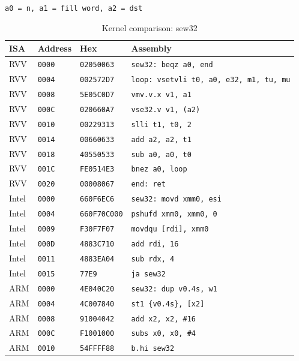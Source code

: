 \begin{table}[htbp]
\centering
\caption{Kernel comparison: sew32}
\begingroup
\scriptsize
\setlength{\tabcolsep}{4pt}
\noindent \texttt{a0 = n, a1 = fill word, a2 = dst}\par
\vspace{0.6ex}
\begin{tabular}{@{}l|l|l|p{7.2cm}@{}}
\toprule
ISA & Address & Hex & Assembly \\
\midrule
RVV & \texttt{0000} & \texttt{02050063} & \texttt{sew32: beqz a0, end} \\
RVV & \texttt{0004} & \texttt{002572D7} & \texttt{loop: vsetvli t0, a0, e32, m1, tu, mu} \\
RVV & \texttt{0008} & \texttt{5E05C0D7} & \texttt{vmv.v.x v1, a1} \\
RVV & \texttt{000C} & \texttt{020660A7} & \texttt{vse32.v v1, (a2)} \\
RVV & \texttt{0010} & \texttt{00229313} & \texttt{slli t1, t0, 2} \\
RVV & \texttt{0014} & \texttt{00660633} & \texttt{add a2, a2, t1} \\
RVV & \texttt{0018} & \texttt{40550533} & \texttt{sub a0, a0, t0} \\
RVV & \texttt{001C} & \texttt{FE0514E3} & \texttt{bnez a0, loop} \\
RVV & \texttt{0020} & \texttt{00008067} & \texttt{end: ret} \\
\midrule
Intel & \texttt{0000} & \texttt{660F6EC6} & \texttt{sew32: movd xmm0, esi} \\
Intel & \texttt{0004} & \texttt{660F70C000} & \texttt{pshufd xmm0, xmm0, 0} \\
Intel & \texttt{0009} & \texttt{F30F7F07} & \texttt{movdqu [rdi], xmm0} \\
Intel & \texttt{000D} & \texttt{4883C710} & \texttt{add rdi, 16} \\
Intel & \texttt{0011} & \texttt{4883EA04} & \texttt{sub rdx, 4} \\
Intel & \texttt{0015} & \texttt{77E9} & \texttt{ja sew32} \\
\midrule
ARM & \texttt{0000} & \texttt{4E040C20} & \texttt{sew32: dup v0.4s, w1} \\
ARM & \texttt{0004} & \texttt{4C007840} & \texttt{st1 \{v0.4s\}, [x2]} \\
ARM & \texttt{0008} & \texttt{91004042} & \texttt{add x2, x2, \#16} \\
ARM & \texttt{000C} & \texttt{F1001000} & \texttt{subs x0, x0, \#4} \\
ARM & \texttt{0010} & \texttt{54FFFF88} & \texttt{b.hi sew32} \\
\bottomrule
\end{tabular}
\endgroup
\end{table}
\noindent{}\par
